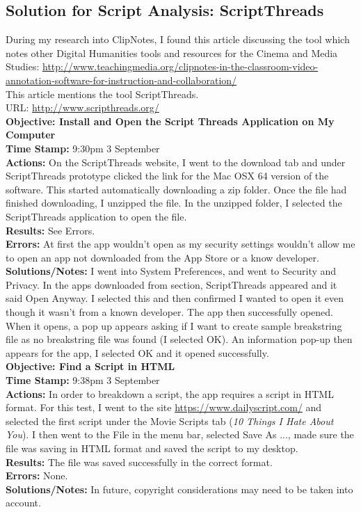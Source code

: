 \documentclass{article}
\begin{document}
\subsection{Solution for Script Analysis: ScriptThreads}
During my research into ClipNotes, I found this article discussing the tool which notes other Digital Humanities tools and resources for the Cinema and Media Studies: \url{http://www.teachingmedia.org/clipnotes-in-the-classroom-video-annotation-software-for-instruction-and-collaboration/}\\
This article mentions the tool ScriptThreads.\\
URL: \url{http://www.scripthreads.org/}\\
\textbf{Objective: Install and Open the Script Threads Application on My Computer}\\
\textbf{Time Stamp:} 9:30pm 3 September\\
\textbf{Actions:} On the ScriptThreads website, I went to the download tab and under ScriptThreads prototype clicked the link for the Mac OSX 64 version of the software. This started automatically downloading a zip folder. Once the file had finished downloading, I unzipped the file. In the unzipped folder, I selected the ScriptThreads application to open the file.\\
\textbf{Results:} See Errors.\\
\textbf{Errors:} At first the app wouldn't open as my security settings wouldn't allow me to open an app not downloaded from the App Store or a know developer.\\
\textbf{Solutions/Notes:} I went into System Preferences, and went to Security and Privacy. In the apps downloaded from section, ScriptThreads appeared and it said Open Anyway. I selected this and then confirmed I wanted to open it even though it wasn't from a known developer. The app then successfully opened. When it opens, a pop up appears asking if I want to create sample breakstring file as no breakstring file was found (I selected OK). An information pop-up then appears for the app, I selected OK and it opened successfully. \\

\textbf{Objective: Find a Script in HTML}\\
\textbf{Time Stamp:} 9:38pm 3 September\\
\textbf{Actions:} In order to breakdown a script, the app requires a script in HTML format. For this test, I went to the site \url{https://www.dailyscript.com/} and selected the first script under the Movie Scripts tab (\textit{10 Things I Hate About You}). I then went to the File in the menu bar, selected Save As ..., made sure the file was saving in HTML format and saved the script to my desktop.\\
\textbf{Results:} The file was saved successfully in the correct format.\\
\textbf{Errors:} None.\\
\textbf{Solutions/Notes:} In future, copyright considerations may need to be taken into account.\\
\end{document}
